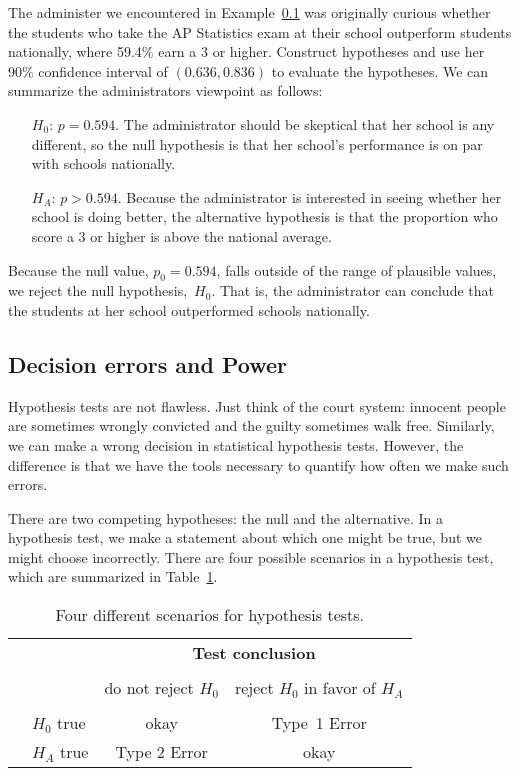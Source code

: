 \begin{example}{The administer we encountered in Example~\ref{} was originally curious whether the students who take the AP Statistics exam at their school outperform students nationally, where 59.4\% earn a 3 or higher. Construct hypotheses and use her 90\% confidence interval of $(0.636, 0.836)$ to evaluate the hypotheses.}
We can summarize the administrators viewpoint as follows:
\begin{itemize}
\item[$H_0$:] $p = 0.594$. The administrator should be skeptical that her school is any different, so the null hypothesis is that her school's performance is on par with schools nationally.
\item[$H_A$:] $p > 0.594$. Because the administrator is interested in seeing whether her school is doing better, the alternative hypothesis is that the proportion who score a 3 or higher is above the national average.
\end{itemize}
Because the null value, $p_0 = 0.594$, falls outside of the range of plausible values, we reject the null hypothesis,~$H_0$. That is, the administrator can conclude that the students at her school outperformed schools nationally.
\end{example}


\subsection{Decision errors and Power}

Hypothesis tests are not flawless. Just think of the court system: innocent people are sometimes wrongly convicted and the guilty sometimes walk free. Similarly, we can make a wrong decision in statistical hypothesis tests. However, the difference is that we have the tools necessary to quantify how often we make such errors.

There are two competing hypotheses: the null and the alternative. In a hypothesis test, we make a statement about which one might be true, but we might choose incorrectly. There are four possible scenarios in a hypothesis test, which are summarized in Table~\ref{fourHTScenarios}.

\begin{table}[ht]
\centering
\begin{tabular}{l l c c}
& & \multicolumn{2}{c}{\textbf{Test conclusion}} \\
  \cline{3-4}
\vspace{-3.7mm} \\
& & do not reject $H_0$ &  reject $H_0$ in favor of $H_A$ \\
  \cline{2-4}
\vspace{-3.7mm} \\
& $H_0$ true & okay &  Type~1 Error \\
\raisebox{1.5ex}{\textbf{Truth}} & $H_A$ true & Type 2 Error & okay \\
  \cline{2-4}
\end{tabular}
\caption{Four different scenarios for hypothesis tests.}
\label{fourHTScenarios}
\end{table}

